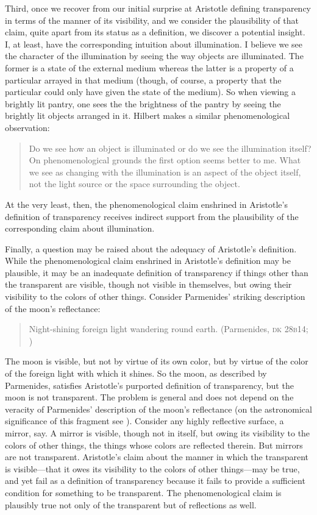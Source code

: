 Third, once we recover from our initial surprise at Aristotle defining transparency in terms of the manner of its visibility, and we consider the plausibility of that claim, quite apart from its status as a definition, we discover a potential insight. I, at least, have the corresponding intuition about illumination. I believe we see the character of the illumination by seeing the way objects are illuminated. The former is a state of the external medium whereas the latter is a property of a particular arrayed in that medium (though, of course, a property that the particular could only have given the state of the medium). So when viewing a brightly lit pantry, one sees the the brightness of the pantry by seeing the brightly lit objects arranged in it.  Hilbert makes a similar phenomenological observation:
\begin{quote}
	Do we see how an object is illuminated or do we see the illumination itself? On phenomenological grounds the first option seems better to me. What we see as changing with the illumination is an aspect of the object itself, not the light source or the space surrounding the object. \citep[150--151]{Hilbert:2007qy}
\end{quote}
At the very least, then, the phenomenological claim enshrined in Aristotle's definition of transparency receives indirect support from the plausibility of the corresponding claim about illumination.

Finally, a question may be raised about the adequacy of Aristotle's definition. While the phenomenological claim enshrined in Aristotle's definition may be plausible, it may be an inadequate definition of transparency if things other than the transparent are visible, though not visible in themselves, but owing their visibility to the colors of other things. Consider Parmenides' striking description of the moon's reflectance:
\begin{quote}
	Night-shining foreign light wandering round earth. (Parmenides, \textsc{dk} 28\textsc{b}14; \citealt[156]{McKirahan:1994ve})
\end{quote}
The moon is visible, but not by virtue of its own color, but by virtue of the color of the foreign light with which it shines. So the moon, as described by Parmenides, satisfies Aristotle's purported definition of transparency, but the moon is not transparent. The problem is general and does not depend on the veracity of Parmenides' description of the moon's reflectance (on the astronomical significance of this fragment see \citealt{Popper:1998aa}). Consider any highly reflective surface, a mirror, say. A mirror is visible, though not in itself, but owing its visibility to the colors of other things, the things whose colors are reflected therein. But mirrors are not transparent. Aristotle's claim about the manner in which the transparent is visible---that it owes its visibility to the colors of other things---may be true, and yet fail as a definition of transparency because it fails to provide a sufficient condition for something to be transparent. The phenomenological claim is plausibly true not only of the transparent but of reflections as well.

